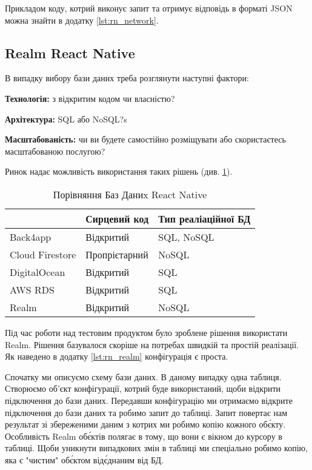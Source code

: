 Прикладом коду, котрий виконує запит та отримує відповідь в форматі JSON можна знайти в додатку \ref{lst:rn_network}.

\subsection{Realm React Native}
\label{subsec:rn_realm}
В випадку вибору бази даних треба розглянути наступні фактори:
\begin{itemize}
    \begin{item}
        \textbf{Технологія:} з відкритим кодом чи власністю?
    \end{item}
    \begin{item}
        \textbf{Архітектура:} SQL або NoSQL?s
    \end{item}
    \begin{item}
        \textbf{Масштабованість:} чи ви будете самостійно розміщувати або скористаєтесь масштабованою послугою?
    \end{item}
\end{itemize}

Ринок надає можливість використання таких рішень (див. \ref{tab:rn_db_comparison}).

\begin{longtable}[c]{|l|l|l|}
    \caption{Порівняння Баз Даниx React Native}
    \label{tab:rn_db_comparison} \\
    \hline
    & Сирцевий код  & Тип реаліаційної БД \\ \hline
    \endhead
%
    Back4app        & Відкритий     & SQL, NoSQL          \\ \hline
    Cloud Firestore & Пропрієтарний & NoSQL               \\ \hline
    DigitalOcean    & Відкритий     & SQL                 \\ \hline
    AWS RDS         & Відкритий     & SQL                 \\ \hline
    Realm           & Відкритий     & NoSQL               \\ \hline
\end{longtable}

Під час роботи над тестовим продуктом було зроблене рішення використати Realm.
Рішення базувалося скоріше на потребах швидкій та простій реалізації.
Як наведено в додатку \ref{lst:rn_realm} конфігурація є проста.

Спочатку ми описуємо схему бази даних. В даному випадку одна таблиця.
Створюємо об'єкт конфігурації, котрий буде використаний, щоби відкрити підключення до бази даних.
Передавши конфігурацію ми отримаємо відкрите підключення до бази даних та робимо запит до таблиці.
Запит повертає нам результат зі збереженими даним з котрих ми робимо копію кожного об\'єкту.
Особливість Realm об\'єктів полягає в тому, що вони є вікном до курсору в таблиці.
Щоби уникнути випадкових змін в таблиці ми спеціально робимо копію, яка є "чистим" об\'єктом від\'єднаним від БД.

